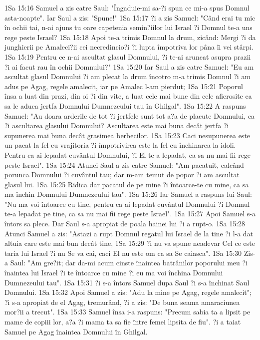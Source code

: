 1Sa 15:16  Samuel a zis catre Saul: "Îngaduie-mi sa-?i spun ce mi-a spus Domnul asta-noapte". Iar Saul a zis: "Spune!"
1Sa 15:17  ?i a zis Samuel: "Când erai tu mic în ochii tai, n-ai ajuns tu oare capetenia semin?iilor lui Israel ?i Domnul te-a uns rege peste Israel?
1Sa 15:18  Apoi te-a trimis Domnul la drum, zicând: Mergi ?i da junghierii pe Amaleci?ii cei necredincio?i ?i lupta împotriva lor pâna îi vei stârpi.
1Sa 15:19  Pentru ce n-ai ascultat glasul Domnului, ?i te-ai aruncat asupra prazii ?i ai facut rau în ochii Domnului?"
1Sa 15:20  Iar Saul a zis catre Samuel: "Eu am ascultat glasul Domnului ?i am plecat la drum încotro m-a trimis Domnul ?i am adus pe Agag, regele amalecit, iar pe Amalec l-am pierdut;
1Sa 15:21  Poporul însa a luat din prazi, din oi ?i din vite, a luat cele mai bune din cele afierosite ca sa le aduca jertfa Domnului Dumnezeului tau în Ghilgal".
1Sa 15:22  A raspuns Samuel: "Au doara arderile de tot ?i jertfele sunt tot a?a de placute Domnului, ca ?i ascultarea glasului Domnului? Ascultarea este mai buna decât jertfa ?i supunerea mai buna decât grasimea berbecilor.
1Sa 15:23  Caci nesupunerea este un pacat la fel cu vrajitoria ?i împotrivirea este la fel cu închinarea la idoli. Pentru ca ai lepadat cuvântul Domnului, ?i El te-a lepadat, ca sa nu mai fii rege peste Israel".
1Sa 15:24  Atunci Saul a zis catre Samuel: "Am pacatuit, calcând porunca Domnului ?i cuvântul tau; dar m-am temut de popor ?i am ascultat glasul lui.
1Sa 15:25  Ridica dar pacatul de pe mine ?i întoarce-te cu mine, ca sa ma închin Domnului Dumnezeului tau".
1Sa 15:26  Iar Samuel a raspuns lui Saul: "Nu ma voi întoarce cu tine, pentru ca ai lepadat cuvântul Domnului ?i Domnul te-a lepadat pe tine, ca sa nu mai fii rege peste Israel".
1Sa 15:27  Apoi Samuel s-a întors sa plece. Dar Saul s-a apropiat de poala hainei lui ?i a rupt-o.
1Sa 15:28  Atunci Samuel a zis: "Astazi a rupt Domnul regatul lui Israel de la tine ?i l-a dat altuia care este mai bun decât tine,
1Sa 15:29  ?i nu va spune neadevar Cel ce este taria lui Israel ?i nu Se va cai, caci El nu este om ca sa Se caiasca".
1Sa 15:30  Zis-a Saul: "Am gre?it; dar da-mi acum cinste înaintea batrânilor poporului meu ?i înaintea lui Israel ?i te întoarce cu mine ?i eu ma voi închina Domnului Dumnezeului tau".
1Sa 15:31  ?i s-a întors Samuel dupa Saul ?i s-a închinat Saul Domnului.
1Sa 15:32  Apoi Samuel a zis: "Adu la mine pe Agag, regele amalecit"; ?i s-a apropiat de el Agag, tremurând, ?i a zis: "De buna seama amaraciunea mor?ii a trecut".
1Sa 15:33  Samuel însa i-a raspuns: "Precum sabia ta a lipsit pe mame de copiii lor, a?a ?i mama ta sa fie între femei lipsita de fiu". ?i a taiat Samuel pe Agag înaintea Domnului în Ghilgal.
